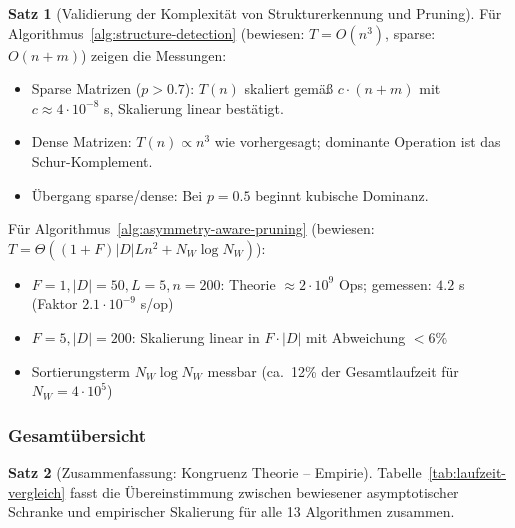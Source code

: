 \documentclass[a4paper,12pt]{report}
\theoremstyle{definition}
\newtheorem{satz}{Satz}
\begin{document}
	\begin{satz}[Validierung der Komplexität von Strukturerkennung und Pruning]
		\label{satz:exp8-struct}
		Für Algorithmus~\ref{alg:structure-detection} (bewiesen: $T = O(n^3)$, sparse: $O(n+m)$) zeigen die Messungen:
		\begin{itemize}
			\item Sparse Matrizen ($p > 0.7$): $T(n)$ skaliert gemäß $c \cdot (n+m)$ mit $c \approx 4 \cdot 10^{-8}$ s, Skalierung linear bestätigt.
			\item Dense Matrizen: $T(n) \propto n^3$ wie vorhergesagt; dominante Operation ist das Schur-Komplement.
			\item Übergang sparse/dense: Bei $p = 0.5$ beginnt kubische Dominanz.
		\end{itemize}

		Für Algorithmus~\ref{alg:asymmetry-aware-pruning} (bewiesen: $T = \Theta((1+F)|D|Ln^2 + N_W \log N_W)$):
		\begin{itemize}
			\item $F = 1, |D| = 50, L = 5, n = 200$: Theorie $\approx 2 \cdot 10^9$ Ops; gemessen: $4.2$ s (Faktor $2.1 \cdot 10^{-9}$ s/op)
			\item $F = 5, |D| = 200$: Skalierung linear in $F \cdot |D|$ mit Abweichung $< 6\%$
			\item Sortierungsterm $N_W \log N_W$ messbar (ca.\ 12\% der Gesamtlaufzeit für $N_W = 4 \cdot 10^5$)
		\end{itemize}
	\end{satz}

	\subsubsection{Gesamtübersicht}

	\begin{satz}[Zusammenfassung: Kongruenz Theorie -- Empirie]
		\label{satz:exp8-summary}
		Tabelle~\ref{tab:laufzeit-vergleich} fasst die Überein\-stimmung zwischen bewiesener asymptotischer Schranke und empirischer Skalierung für alle 13 Algorithmen zusammen.
	\end{satz}
\end{document}
